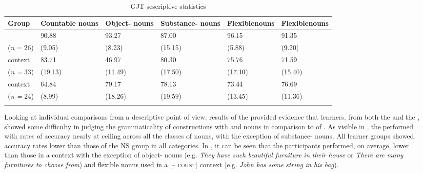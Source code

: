 \documentclass[output=paper]{langsci/langscibook}
\begin{document}
\begin{table}
\caption{GJT sescriptive statistics}
\label{tab:thomas:6}
\small
\begin{tabularx}{\textwidth}{QYYYYY}
\lsptoprule
\bfseries Group &
\bfseries Countable nouns & 
\bfseries Object- nouns & 
\bfseries Substance- nouns & 
\bfseries Flexible nouns & 
\bfseries Flexible nouns\\
\midrule
{} & 90.88 & 93.27 & {87.00} & {96.15} & 91.35\\
(\textit{n} = 26) & (9.05) & (8.23) & {(15.15)} & {(5.88)} & (9.20)\\
 context & 83.71 & 46.97 & {80.30} & {75.76} & 71.59\\
(\textit{n =} 33) & (19.13) & (11.49) & {(17.50)} & {(17.10)} & (15.40)\\
 context & 64.84 & 79.17 & {78.13} & {73.44} & 76.69\\
(\textit{n =} 24) & (8.99) & (18.26) & {(19.59)} & {(13.45)} & (11.36)\\
\lspbottomrule
\end{tabularx}
\end{table}

Looking at individual comparisons from a descriptive point of view, results of the  provided evidence that   learners, from both the  and the , showed some difficulty in judging the grammaticality of constructions with  and  nouns in comparison to  of . As visible in , the  performed with rates of accuracy nearly at ceiling across all the classes of nouns, with the exception of substance- nouns. All learner groups  showed accuracy rates lower than those of the NS group in all categories. In , it can be seen that the  participants performed, on average, lower than those in a  context with the exception of object- nouns (e.g. \textit{They have such beautiful furniture in their house} or \textit{There are many furnitures to choose from}) and flexible nouns used in a [\textsc{– count}] context (e.g. \textit{John has some string in his bag}). 
\end{document}
